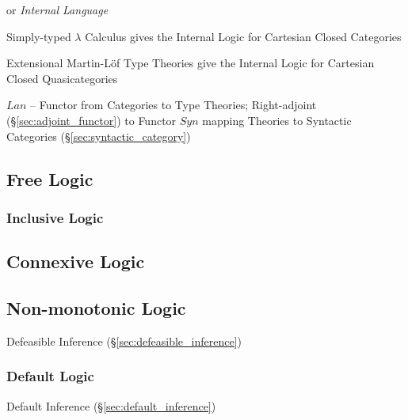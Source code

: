 or \emph{Internal Language}

Simply-typed $\lambda$ Calculus gives the Internal Logic for
Cartesian Closed Categories

Extensional Martin-L\"of Type Theories give the Internal Logic for
Cartesian Closed Quasicategories

$Lan$ -- Functor from Categories to Type Theories; Right-adjoint
(\S\ref{sec:adjoint_functor}) to Functor $Syn$ mapping Theories to
Syntactic Categories (\S\ref{sec:syntactic_category})



\subsection{Free Logic}\label{sec:free_logic}

\subsubsection{Inclusive Logic}\label{sec:inclusive_logic}



\subsection{Connexive Logic}\label{sec:connexive_logic}

\subsection{Non-monotonic Logic}\label{sec:nonmonotonic_logic}

Defeasible Inference (\S\ref{sec:defeasible_inference})



\subsubsection{Default Logic}\label{sec:default_logic}

Default Inference (\S\ref{sec:default_inference})



